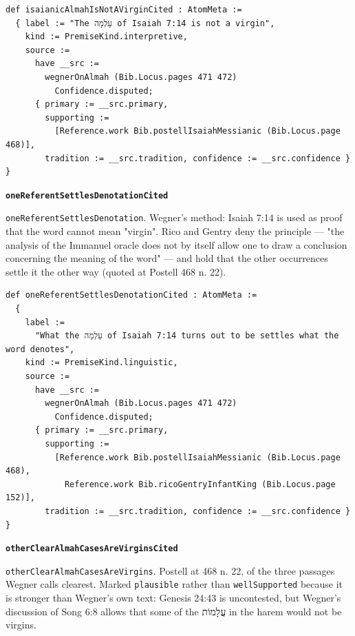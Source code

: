 \documentclass[11pt]{article}
\begin{document}
{\small\begin{verbatim}
def isaianicAlmahIsNotAVirginCited : AtomMeta :=
  { label := "The עַלְמָה of Isaiah 7:14 is not a virgin",
    kind := PremiseKind.interpretive,
    source :=
      have __src :=
        wegnerOnAlmah (Bib.Locus.pages 471 472)
          Confidence.disputed;
      { primary := __src.primary,
        supporting :=
          [Reference.work Bib.postellIsaiahMessianic (Bib.Locus.page 468)],
        tradition := __src.tradition, confidence := __src.confidence } }
\end{verbatim}}
\par\medskip\noindent\textbf{\texttt{one\allowbreak{}Referent\allowbreak{}Settles\allowbreak{}Denotation\allowbreak{}Cited}}\par\nobreak\noindent
\texttt{one\allowbreak{}Referent\allowbreak{}Settles\allowbreak{}Denotation}. Wegner's method: Isaiah 7:14 is used as proof that the word cannot mean "virgin". Rico and Gentry deny the principle — "the analysis of the Immanuel oracle does not by itself allow one to draw a conclusion concerning the meaning of the word" — and hold that the other occurrences settle it the other way (quoted at Postell 468 n. 22).

{\small\begin{verbatim}
def oneReferentSettlesDenotationCited : AtomMeta :=
  {
    label :=
      "What the עַלְמָה of Isaiah 7:14 turns out to be settles what the word denotes",
    kind := PremiseKind.linguistic,
    source :=
      have __src :=
        wegnerOnAlmah (Bib.Locus.pages 471 472)
          Confidence.disputed;
      { primary := __src.primary,
        supporting :=
          [Reference.work Bib.postellIsaiahMessianic (Bib.Locus.page 468),
            Reference.work Bib.ricoGentryInfantKing (Bib.Locus.page 152)],
        tradition := __src.tradition, confidence := __src.confidence } }
\end{verbatim}}
\par\medskip\noindent\textbf{\texttt{other\allowbreak{}Clear\allowbreak{}Almah\allowbreak{}Cases\allowbreak{}Are\allowbreak{}Virgins\allowbreak{}Cited}}\par\nobreak\noindent
\texttt{other\allowbreak{}Clear\allowbreak{}Almah\allowbreak{}Cases\allowbreak{}Are\allowbreak{}Virgins}. Postell at 468 n. 22, of the three passages Wegner calls clearest. Marked \texttt{plausible} rather than \texttt{well\allowbreak{}Supported} because it is stronger than Wegner's own text: Genesis 24:43 is uncontested, but Wegner's discussion of Song 6:8 allows that some of the עֲלָמוֹת in the harem would not be virgins.
\end{document}
